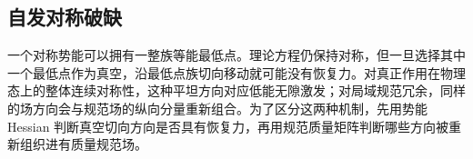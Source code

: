 \subsection{自发对称破缺}
一个对称势能可以拥有一整族等能最低点。理论方程仍保持对称，但一旦选择其中一个最低点作为真空，沿最低点族切向移动就可能没有恢复力。对真正作用在物理态上的整体连续对称性，这种平坦方向对应低能无隙激发；对局域规范冗余，同样的场方向会与规范场的纵向分量重新组合。为了区分这两种机制，先用势能 Hessian 判断真空切向方向是否具有恢复力，再用规范质量矩阵判断哪些方向被重新组织进有质量规范场。


